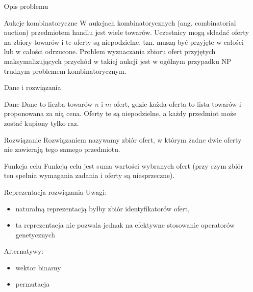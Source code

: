\begin{frame}{Opis problemu}
    \begin{block}{Aukcje kombinatoryczne}
        W aukcjach kombinatorycznych (ang. combinatorial auction) przedmiotem handlu jest wiele towarów.
        Uczestnicy mogą składać oferty na zbiory towarów i te oferty są niepodzielne, tzn. muszą być przyjęte
        w całości lub w całości odrzucone. Problem wyznaczania zbioru ofert przyjętych maksymalizujących
        przychód w takiej aukcji jest w ogólnym przypadku NP trudnym problemem kombinatorycznym.
    \end{block}
\end{frame}

\begin{frame}{Dane i rozwiązania}

    \begin{block}{Dane}
        Dane to liczba towarów $n$ i $m$ ofert, gdzie każda oferta to lista towarów i proponowana za nią cena.
        Oferty te są niepodzielne, a każdy przedmiot może zostać kupiony tylko raz.
    \end{block}

    \begin{block}{Rozwiązanie}
        Rozwiązaniem nazywamy zbiór ofert, w którym żadne dwie oferty nie zawierają tego samego przedmiotu.
    \end{block}

    \begin{block}{Funkcja celu}
        Funkcją celu jest suma wartości wybranych ofert (przy czym zbiór ten spełnia wymagania zadania i oferty są
        niesprzeczne).
    \end{block}

\end{frame}

\begin{frame}{Reprezentacja rozwiązania}
Uwagi:
\begin{itemize}
\item naturalną reprezentacją byłby zbiór identyfikatorów ofert,
\item ta reprezentacja nie pozwala jednak na efektywne stosowanie operatorów genetycznych
\end{itemize}
\vspace{1em}
Alternatywy:
\begin{itemize}
\item wektor binarny
\item permutacja
\end{itemize}
\end{frame}

